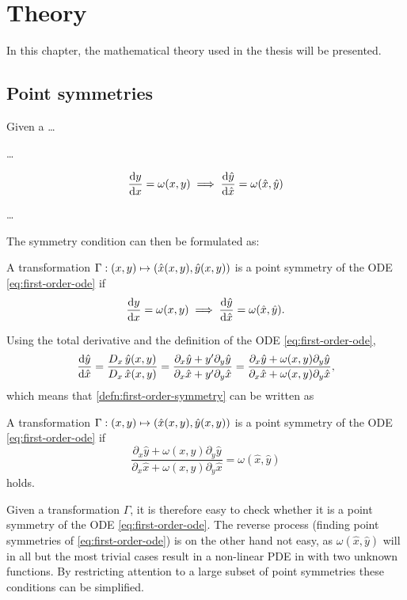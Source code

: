 \chapter{Theory}

In this chapter, the mathematical theory used in the thesis will be presented.

\section{Point symmetries}

Given a \dots

\dots

\begin{equation} \label{eq:first-order-ode}
  \dv{y}{x} = \omega(x,y)
  \implies
  \dv{\hat{y}}{\hat{x}} = \omega(\hat{x},\hat{y})
\end{equation}

\dots

The symmetry condition can then be formulated as: %
\begin{defn} \label{defn:first-order-symmetry}
  A transformation \(\Gamma: \pqty{x,y} \mapsto \pqty{\hat{x}(x,y), \hat{y}(x,y)}\) is a point symmetry of the ODE \ref{eq:first-order-ode} if
  \begin{equation}
    \dv{y}{x} = \omega(x,y)
    \implies
    \dv{\hat{y}}{\hat{x}} = \omega(\hat{x},\hat{y}).
  \end{equation}
\end{defn}
Using the total derivative and the definition of the ODE \ref{eq:first-order-ode},
\begin{equation}
  \dv{\hat{y}}{\hat{x}} = 
  \frac{D_{x}\, \hat{y}(x,y)}{D_{x}\, \hat{x}(x,y)} =
  \frac{\partial_x \hat{y} + y' \partial_y \hat{y}}{\partial_x \hat{x} + y' \partial_y \hat{x}} =
  \frac{\partial_x \hat{y} + \omega(x,y) \partial_y \hat{y}}{\partial_x \hat{x} + \omega(x,y) \partial_y \hat{x}},
\end{equation}
which means that \cref{defn:first-order-symmetry} can be written as
\begin{lem} \label{defn:simple-first-order-symmetry}
  A transformation \(\Gamma: \pqty{x,y} \mapsto \pqty{\hat{x}(x,y), \hat{y}(x,y)}\) is a point symmetry of the ODE \ref{eq:first-order-ode} if
  \begin{equation} \label{eq:simple-first-order-symmetry}
    \frac{\partial_x \hat{y} + \omega(x,y) \partial_y \hat{y}}{\partial_x \hat{x} + \omega(x,y) \partial_y \hat{x}} = \omega(\hat{x},\hat{y})
  \end{equation}
  holds.
\end{lem} %
Given a transformation \(\Gamma\), it is therefore easy to check whether it is a point symmetry of the ODE \ref{eq:first-order-ode}.
The reverse process (finding point symmetries of \cref{eq:first-order-ode}) is on the other hand not easy, as \(\omega(\hat{x},\hat{y})\) will in all but the most trivial cases result in a non-linear PDE in with two unknown functions.
By restricting attention to a large subset of point symmetries these conditions can be simplified.

